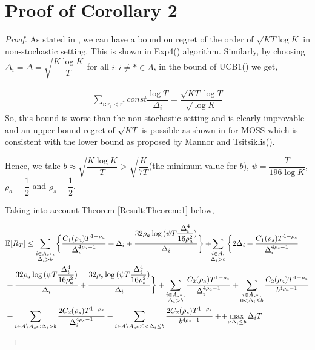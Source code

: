 \section{Proof of Corollary 2}
\label{App:Proof:Corollary:2}
\begin{proof}
As stated in \cite{auer2010ucb}, we can have a bound on regret of the order of $\sqrt{KT\log K}$ in non-stochastic setting. This is shown in Exp4(\cite{auer2002nonstochastic}) algorithm. Similarly, by choosing  $\Delta_{i}=\Delta=\sqrt{\dfrac{K\log K}{T}}$ for all ${i:i\neq *}\in A$, in the bound of UCB1(\cite{auer2002finite}) we get,

\begin{align*}
\sum_{i:r_{i}<r^{*}}const \dfrac{\log T}{\Delta_{i}}=\dfrac{\sqrt{KT}\log T}{\sqrt{\log K}}
\end{align*}
So, this bound is worse than the non-stochastic setting and is clearly improvable and an upper bound regret of $\sqrt{KT}$ is possible as shown in \cite{audibert2009minimax} for MOSS which is consistent with the lower bound as proposed by Mannor and Tsitsiklis(\cite{mannor2004sample}).

	Hence, we take $b\approx\sqrt{\dfrac{K\log K}{T}} > \sqrt{\dfrac{K}{7T}}$(the minimum value for $b$), $\psi=\dfrac{T}{196 \log K}$, $\rho_{a}=\dfrac{1}{2}$ and $\rho_{s}=\dfrac{1}{2}$.
	
	Taking into account Theorem \ref{Result:Theorem:1} below, 
	
\begin{align*}
&\mathbb{E} [R_{T}]\leq 
\sum\limits_{\substack{i\in A_{s^{*}},\\\Delta_{i} > b}}\bigg\lbrace \dfrac{C_1(\rho_{a})T^{1-\rho_{a}}}{\Delta_{i}^{4\rho_{a}-1}} + \Delta_{i}
 + \frac{32\rho_{a}\log{(\psi T\dfrac{\Delta_{i}^{4}}{16\rho_{a}^{2}})}}{\Delta_{i}} \bigg\rbrace
 + \! \! \sum\limits_{\substack{i\in A,\\\Delta_{i} > b}} \bigg\lbrace 2\Delta_{i}+
\dfrac{C_1(\rho_{s})T^{1-\rho_{s}}}{\Delta_{i}^{4\rho_{s}-1}} \\
&+ \frac{32\rho_{a}\log{(\psi T\dfrac{\Delta_{i}^{4}}{16\rho_{a}^{2}})}}{\Delta_{i}} 
+ \dfrac{32\rho_{s}\log{(\psi T\dfrac{\Delta_{i}^{4}}{16\rho_{s}^{2}})}}{\Delta_{i}}\bigg\rbrace 
+ \sum\limits_{\substack{i\in A_{s^{*}},\\ \Delta_{i} > b}} 
\frac{C_2(\rho_{a})T^{1-\rho_{a}}}{\Delta_{i}^{4\rho_{a}-1}}
+\sum\limits_{\substack{i\in A_{s^{*}},\\0 < \Delta_{i}\leq b}}\frac{C_2(\rho_a)T^{1-\rho_{a}}}{b^{4\rho_{a} -1}}\\ 
 & + \sum_{i\in A\setminus A_{s^*}: \Delta_{i} > b}\dfrac{2C_{2}(\rho_{s})T^{1-\rho_{s}}}{\Delta_{i}^{4\rho_{s}-1}} +\sum_{i\in A\setminus A_{s^*}: 0 < \Delta_{i} \leq b}\dfrac{2C_{2}(\rho_{s})T^{1-\rho_{s}}}{b^{4\rho_{s}-1}} +
 \!+\! \max\limits_{i:\Delta_{i}\leq b}\Delta_{i}T
\end{align*}


\end{proof}
